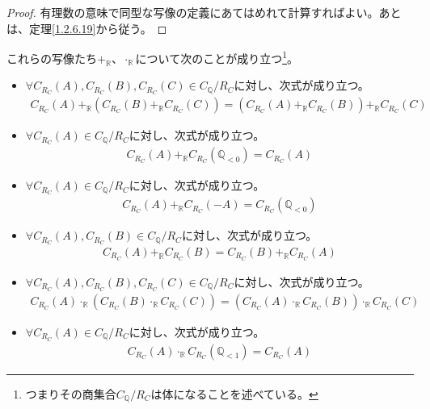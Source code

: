 \documentclass[dvipdfmx]{jsarticle}
\begin{document}
\begin{proof}
有理数の意味で同型な写像の定義にあてはめれて計算すればよい。あとは、定理\ref{1.2.6.19}から従う。
\end{proof}
\begin{thm}\label{1.2.6.33}
これらの写像たち$+_{\mathbb{R}}$、$\cdot_{\mathbb{R}}$について次のことが成り立つ\footnote{つまりその商集合$C_{\mathbb{Q}} /R_{C} $は体になることを述べている。}。
\begin{itemize}
\item
  $\forall C_{R_{C}}(A),C_{R_{C}}(B),C_{R_{C}}(C) \in C_{\mathbb{Q}} /R_{C} $に対し、次式が成り立つ。
\begin{align*}
C_{R_{C}}(A) +_{\mathbb{R}}\left( C_{R_{C}}(B) +_{\mathbb{R}}C_{R_{C}}(C) \right) = \left( C_{R_{C}}(A) +_{\mathbb{R}}C_{R_{C}}(B) \right) +_{\mathbb{R}}C_{R_{C}}(C)
\end{align*}
\item
  $\forall C_{R_{C}}(A) \in C_{\mathbb{Q}} /R_{C} $に対し、次式が成り立つ。
\begin{align*}
C_{R_{C}}(A) +_{\mathbb{R}}C_{R_{C}}\left( \mathbb{Q}_{< 0} \right) = C_{R_{C}}(A)
\end{align*}
\item
  $\forall C_{R_{C}}(A) \in C_{\mathbb{Q}} /R_{C} $に対し、次式が成り立つ。
\begin{align*}
C_{R_{C}}(A) +_{\mathbb{R}}C_{R_{C}}( - A) = C_{R_{C}}\left( \mathbb{Q}_{< 0} \right)
\end{align*}
\item
  $\forall C_{R_{C}}(A),C_{R_{C}}(B) \in C_{\mathbb{Q}} /R_{C} $に対し、次式が成り立つ。
\begin{align*}
C_{R_{C}}(A) +_{\mathbb{R}}C_{R_{C}}(B) = C_{R_{C}}(B) +_{\mathbb{R}}C_{R_{C}}(A)
\end{align*}
\item
  $\forall C_{R_{C}}(A),C_{R_{C}}(B),C_{R_{C}}(C) \in C_{\mathbb{Q}} /R_{C} $に対し、次式が成り立つ。
\begin{align*}
C_{R_{C}}(A) \cdot_{\mathbb{R}}\left( C_{R_{C}}(B) \cdot_{\mathbb{R}}C_{R_{C}}(C) \right) = \left( C_{R_{C}}(A) \cdot_{\mathbb{R}}C_{R_{C}}(B) \right) \cdot_{\mathbb{R}}C_{R_{C}}(C)
\end{align*}
\item
  $\forall C_{R_{C}}(A) \in C_{\mathbb{Q}} /R_{C} $に対し、次式が成り立つ。
\begin{align*}
C_{R_{C}}(A) \cdot_{\mathbb{R}}C_{R_{C}}\left( \mathbb{Q}_{< 1} \right) = C_{R_{C}}(A)
\end{align*}

\end{itemize}
\end{thm}
\end{document}
